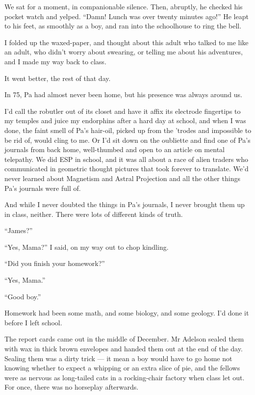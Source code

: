 We sat for a moment, in companionable silence. Then, abruptly, he
checked his pocket watch and yelped.
``Damn! Lunch was over twenty minutes ago!'' He leapt to his feet,
as smoothly as a boy, and ran into the schoolhouse to ring the
bell.

I folded up the waxed-paper, and thought about this adult who
talked to me like an adult, who didn't worry about swearing, or
telling me about his adventures, and I made my way back to class.

It went better, the rest of that day.

\tb

In 75, Pa had almost never been home, but his presence was always
around us.

I'd call the robutler out of its closet and have it affix its
electrode fingertips to my temples and juice my endorphins after a
hard day at school, and when I was done, the faint smell of Pa's
hair-oil, picked up from the 'trodes and impossible to be rid of,
would cling to me. Or I'd sit down on the oubliette and find one of
Pa's journals from back home, well-thumbed and open to an article
on mental telepathy. We did ESP in school, and it was all about a
race of alien traders who communicated in geometric thought
pictures that took forever to translate. We'd never learned about
Magnetism and Astral Projection and all the other things Pa's
journals were full of.

And while I never doubted the things in Pa's journals, I never
brought them up in class, neither. There were lots of different
kinds of truth.

``James?''

``Yes, Mama?'' I said, on my way out to chop kindling.

``Did you finish your homework?''

``Yes, Mama.''

``Good boy.''

Homework had been some math, and some biology, and some geology.
I'd done it before I left school.

\tb

The report cards came out in the middle of December. Mr Adelson
sealed them with wax in thick brown envelopes and handed them out
at the end of the day. Sealing them was a dirty trick --- it mean a
boy would have to go home not knowing whether to expect a whipping
or an extra slice of pie, and the fellows were as nervous as
long-tailed cats in a rocking-chair factory when class let out. For
once, there was no horseplay afterwards.


